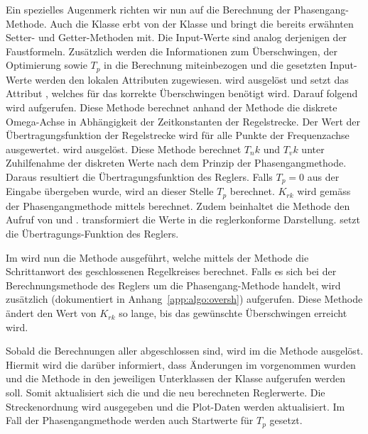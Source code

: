 Ein   spezielles  Augenmerk   richten   wir  nun   auf   die  Berechnung   der
Phasengang-Methode. Auch  die   Klasse     erbt  von
der  Klasse    und  bringt die  bereits  erw\"ahnten  Setter-
und   Getter-Methoden  mit. Die   Input-Werte  sind   analog  derjenigen   der
Faustformeln. Zus\"atzlich  werden  die   Informationen  zum  \"Uberschwingen,
der   Optimierung   sowie   $T_p$   in  die   Berechnung   miteinbezogen   und
die   gesetzten  Input-Werte   werden  den   lokalen  Attributen   zugewiesen.
   wird   ausgel\"ost   und  setzt   das   Attribut
,   welches   f\"ur   das   korrekte   \"Uberschwingen   ben\"otigt
wird. Darauf   folgend  wird     aufgerufen. Diese   Methode
berechnet   anhand   der   Methode      die   diskrete
Omega-Achse  in  Abh\"angigkeit  der  Zeitkonstanten  der  Regelstrecke.   Der
Wert  der  \"Ubertragungsfunktion  der  Regelstrecke wird  f\"ur  alle  Punkte
der Frequenzachse  ausgewertet.   wird ausgel\"ost. Diese
Methode  berechnet   $T_nk$  und  $T_vk$  unter   Zuhilfenahme  der  diskreten
Werte   nach  dem   Prinzip  der   Phasengangmethode. Daraus  resultiert   die
\"Ubertragungsfunktion  des   Reglers. Falls  $T_p   =  0$  aus   der  Eingabe
\"ubergeben   wurde,  wird   an   dieser   Stelle  $T_p$   berechnet. $K_{rk}$
wird    gem\"ass   der    Phasengangmethode   mittels    
berechnet. Zudem    beinhaltet   die    Methode       den
Aufruf     von         und    .
 transformiert die Werte in die reglerkonforme
Darstellung.  setzt die \"Ubertragungs-Funktion des Reglers.

Im        wird    nun    die    Methode    
ausgef\"uhrt,  welche   mittels  der   Methode  
die   Schrittanwort  des   geschlossenen   Regelkreises  berechnet. Falls   es
sich  bei  der  Berechnungsmethode   des  Reglers  um  die  Phasengang-Methode
handelt,  wird  zus\"atzlich   (dokumentiert  in
Anhang~\ref{app:algo:oversh}) aufgerufen. Diese Methode  \"andert den Wert von
$K_{rk}$ so lange, bis das gew\"unschte \"Uberschwingen erreicht wird.

Sobald die  Berechnungen aller  abgeschlossen  sind, wird im
  die  Methode   ausgel\"ost. Hiermit  wird
die    dar\"uber  informiert,  dass  \"Anderungen  im  
vorgenommen  wurden   und  die  Methode     in  den  jeweiligen
Unterklassen der Klasse  aufgerufen werden soll. Somit aktualisiert
sich die  und  die neu berechneten Reglerwerte. Die Streckenordnung
wird  ausgegeben   und  die   Plot-Daten  werden  aktualisiert. Im   Fall  der
Phasengangmethode werden auch Startwerte f\"ur $T_p$ gesetzt.

